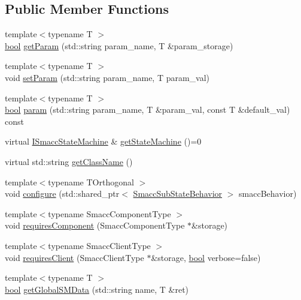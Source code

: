 \subsection*{Public Member Functions}
\begin{DoxyCompactItemize}
\item 
{\footnotesize template$<$typename T $>$ }\\\hyperlink{classbool}{bool} \hyperlink{classsmacc_1_1ISmaccState_abbb3a24b912c6e8de28f7b86123b6357}{get\+Param} (std\+::string param\+\_\+name, T \&param\+\_\+storage)
\item 
{\footnotesize template$<$typename T $>$ }\\void \hyperlink{classsmacc_1_1ISmaccState_a0b6c531ca8c446052022308548f55b92}{set\+Param} (std\+::string param\+\_\+name, T param\+\_\+val)
\item 
{\footnotesize template$<$typename T $>$ }\\\hyperlink{classbool}{bool} \hyperlink{classsmacc_1_1ISmaccState_a4982f2187ed6da337462721146e8ef70}{param} (std\+::string param\+\_\+name, T \&param\+\_\+val, const T \&default\+\_\+val) const 
\item 
virtual \hyperlink{classsmacc_1_1ISmaccStateMachine}{I\+Smacc\+State\+Machine} \& \hyperlink{classsmacc_1_1ISmaccState_a562bb3f9a3ac16b8be71e4794c9e7523}{get\+State\+Machine} ()=0
\item 
virtual std\+::string \hyperlink{classsmacc_1_1ISmaccState_a5bf0b49d5ea6b9e8f45c26fa155b2664}{get\+Class\+Name} ()
\item 
{\footnotesize template$<$typename T\+Orthogonal $>$ }\\void \hyperlink{classsmacc_1_1ISmaccState_aecb72f0a371a3973147aad38ab604b64}{configure} (std\+::shared\+\_\+ptr$<$ \hyperlink{classsmacc_1_1SmaccSubStateBehavior}{Smacc\+Sub\+State\+Behavior} $>$ smacc\+Behavior)
\item 
{\footnotesize template$<$typename Smacc\+Component\+Type $>$ }\\void \hyperlink{classsmacc_1_1ISmaccState_afd5264c36403d22e124eea89a0122e59}{requires\+Component} (Smacc\+Component\+Type $\ast$\&storage)
\item 
{\footnotesize template$<$typename Smacc\+Client\+Type $>$ }\\void \hyperlink{classsmacc_1_1ISmaccState_a0f116de85bbc91d94e1eb2f74502acd8}{requires\+Client} (Smacc\+Client\+Type $\ast$\&storage, \hyperlink{classbool}{bool} verbose=false)
\item 
{\footnotesize template$<$typename T $>$ }\\\hyperlink{classbool}{bool} \hyperlink{classsmacc_1_1ISmaccState_ad6811b03329d9e694e78bc4b1220c2c0}{get\+Global\+S\+M\+Data} (std\+::string name, T \&ret)

\end{DoxyCompactItemize}
